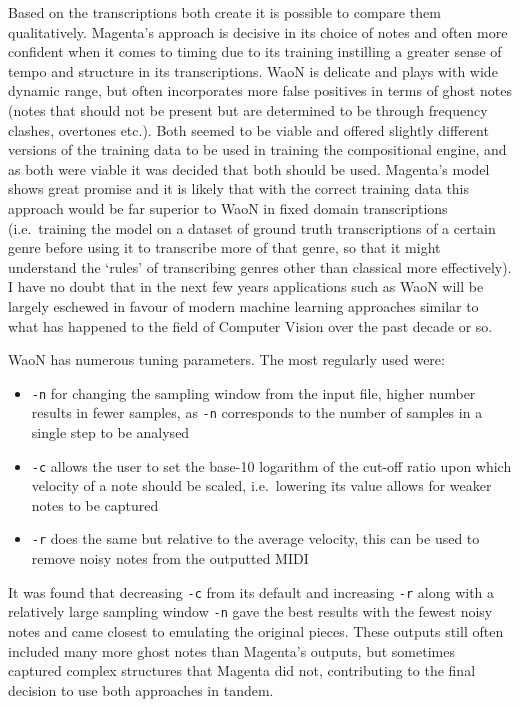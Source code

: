 \documentclass[12pt,]{article}
\providecommand{\tightlist}{%
  \setlength{\itemsep}{0pt}\setlength{\parskip}{0pt}}
\begin{document}
Based on the transcriptions both create it is possible to compare them
qualitatively. Magenta's approach is decisive in its choice of notes and
often more confident when it comes to timing due to its training
instilling a greater sense of tempo and structure in its transcriptions.
WaoN is delicate and plays with wide dynamic range, but often
incorporates more false positives in terms of ghost notes (notes that
should not be present but are determined to be through frequency
clashes, overtones etc.). Both seemed to be viable and offered slightly
different versions of the training data to be used in training the
compositional engine, and as both were viable it was decided that both
should be used. Magenta's model shows great promise and it is likely
that with the correct training data this approach would be far superior
to WaoN in fixed domain transcriptions (i.e.~training the model on a
dataset of ground truth transcriptions of a certain genre before using
it to transcribe more of that genre, so that it might understand the
`rules' of transcribing genres other than classical more effectively). I
have no doubt that in the next few years applications such as WaoN will
be largely eschewed in favour of modern machine learning approaches
similar to what has happened to the field of Computer Vision over the
past decade or so.

WaoN has numerous tuning parameters. The most regularly used were:

\begin{itemize}
\tightlist
\item
  \texttt{-n} for changing the sampling window from the input file,
  higher number results in fewer samples, as \texttt{-n} corresponds to
  the number of samples in a single step to be analysed
\item
  \texttt{-c} allows the user to set the base-10 logarithm of the
  cut-off ratio upon which velocity of a note should be scaled,
  i.e.~lowering its value allows for weaker notes to be captured
\item
  \texttt{-r} does the same but relative to the average velocity, this
  can be used to remove noisy notes from the outputted MIDI
\end{itemize}

It was found that decreasing \texttt{-c} from its default and increasing
\texttt{-r} along with a relatively large sampling window \texttt{-n}
gave the best results with the fewest noisy notes and came closest to
emulating the original pieces. These outputs still often included many
more ghost notes than Magenta's outputs, but sometimes captured complex
structures that Magenta did not, contributing to the final decision to
use both approaches in tandem.
\end{document}
